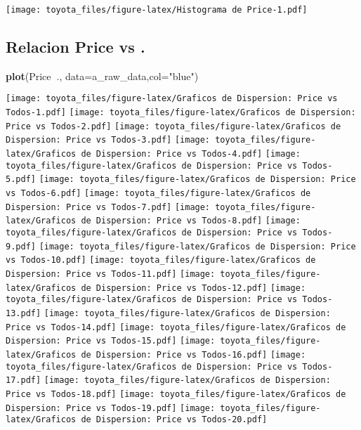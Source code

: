 \documentclass[]{article}
\newenvironment{Shaded}{\begin{snugshade}}{\end{snugshade}}
\newcommand{\DataTypeTok}[1]{\textcolor[rgb]{0.13,0.29,0.53}{#1}}
\newcommand{\KeywordTok}[1]{\textcolor[rgb]{0.13,0.29,0.53}{\textbf{#1}}}
\newcommand{\NormalTok}[1]{#1}
\newcommand{\OperatorTok}[1]{\textcolor[rgb]{0.81,0.36,0.00}{\textbf{#1}}}
\newcommand{\StringTok}[1]{\textcolor[rgb]{0.31,0.60,0.02}{#1}}
\begin{document}
\texttt{[image: toyota\_files/figure-latex/Histograma de Price-1.pdf]}

\hypertarget{relacion-price-vs-.}{%
\subsection{Relacion Price vs .}\label{relacion-price-vs-.}}

\begin{Shaded}
\begin{Highlighting}[]
\KeywordTok{plot}\NormalTok{(Price}\OperatorTok{~}\NormalTok{., }\DataTypeTok{data=}\NormalTok{a_raw_data,}\DataTypeTok{col=}\StringTok{"blue"}\NormalTok{)}
\end{Highlighting}
\end{Shaded}

\texttt{[image: toyota\_files/figure-latex/Graficos de Dispersion: Price vs Todos-1.pdf]}
\texttt{[image: toyota\_files/figure-latex/Graficos de Dispersion: Price vs Todos-2.pdf]}
\texttt{[image: toyota\_files/figure-latex/Graficos de Dispersion: Price vs Todos-3.pdf]}
\texttt{[image: toyota\_files/figure-latex/Graficos de Dispersion: Price vs Todos-4.pdf]}
\texttt{[image: toyota\_files/figure-latex/Graficos de Dispersion: Price vs Todos-5.pdf]}
\texttt{[image: toyota\_files/figure-latex/Graficos de Dispersion: Price vs Todos-6.pdf]}
\texttt{[image: toyota\_files/figure-latex/Graficos de Dispersion: Price vs Todos-7.pdf]}
\texttt{[image: toyota\_files/figure-latex/Graficos de Dispersion: Price vs Todos-8.pdf]}
\texttt{[image: toyota\_files/figure-latex/Graficos de Dispersion: Price vs Todos-9.pdf]}
\texttt{[image: toyota\_files/figure-latex/Graficos de Dispersion: Price vs Todos-10.pdf]}
\texttt{[image: toyota\_files/figure-latex/Graficos de Dispersion: Price vs Todos-11.pdf]}
\texttt{[image: toyota\_files/figure-latex/Graficos de Dispersion: Price vs Todos-12.pdf]}
\texttt{[image: toyota\_files/figure-latex/Graficos de Dispersion: Price vs Todos-13.pdf]}
\texttt{[image: toyota\_files/figure-latex/Graficos de Dispersion: Price vs Todos-14.pdf]}
\texttt{[image: toyota\_files/figure-latex/Graficos de Dispersion: Price vs Todos-15.pdf]}
\texttt{[image: toyota\_files/figure-latex/Graficos de Dispersion: Price vs Todos-16.pdf]}
\texttt{[image: toyota\_files/figure-latex/Graficos de Dispersion: Price vs Todos-17.pdf]}
\texttt{[image: toyota\_files/figure-latex/Graficos de Dispersion: Price vs Todos-18.pdf]}
\texttt{[image: toyota\_files/figure-latex/Graficos de Dispersion: Price vs Todos-19.pdf]}
\texttt{[image: toyota\_files/figure-latex/Graficos de Dispersion: Price vs Todos-20.pdf]}
\end{document}
